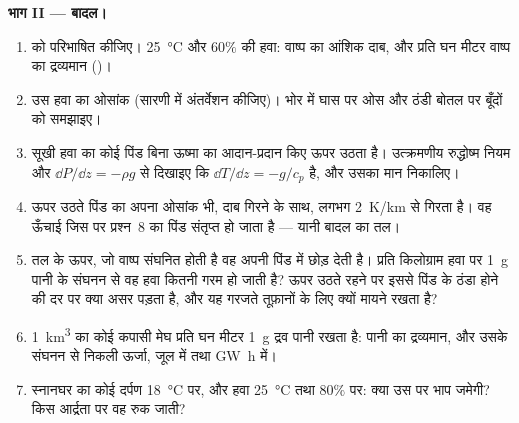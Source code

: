 \begin{problem}
\medskip
\noindent\textbf{भाग II --- बादल।}
\begin{enumerate}[resume]
  \item {} को परिभाषित कीजिए। \qty{25}{\degreeCelsius} और $60\%$
        की हवा: वाष्प का आंशिक दाब, और प्रति घन मीटर वाष्प का द्रव्यमान
        ()।
  \item उस हवा का ओसांक (सारणी में अंतर्वेशन कीजिए)। भोर में घास पर ओस और
        ठंडी बोतल पर बूँदों को समझाइए।
  \item सूखी हवा का कोई पिंड बिना ऊष्मा का आदान-प्रदान किए ऊपर उठता है।
        उत्क्रमणीय रुद्धोष्म नियम और 
        $\dd P/\dd z = -\rho g$ से दिखाइए कि $\dd T/\dd z = -g/c_p$ है, और
        उसका मान निकालिए।
  \item ऊपर उठते पिंड का अपना ओसांक भी, दाब गिरने के साथ, लगभग
        \qty{2}{K/km} से गिरता है। वह ऊँचाई जिस पर प्रश्न~8 का पिंड
        संतृप्त हो जाता है --- यानी बादल का तल।
  \item तल के ऊपर, जो वाष्प संघनित होती है वह अपनी  पिंड में
        छोड़ देती है। प्रति किलोग्राम हवा पर \qty{1}{g} पानी के संघनन से वह
        हवा कितनी गरम हो जाती है? ऊपर उठते रहने पर इससे पिंड के ठंडा होने
        की दर पर क्या असर पड़ता है, और यह गरजते तूफ़ानों के लिए क्यों
        मायने रखता है?
  \item \qty{1}{km^3} का कोई कपासी मेघ प्रति घन मीटर \qty{1}{g} द्रव पानी
        रखता है: पानी का द्रव्यमान, और उसके संघनन से निकली ऊर्जा, जूल में
        तथा \unit{GW h} में।
  \item स्नानघर का कोई दर्पण \qty{18}{\degreeCelsius} पर, और हवा
        \qty{25}{\degreeCelsius} तथा $80\%$ पर: क्या उस पर भाप जमेगी? किस
        आर्द्रता पर वह रुक जाती?
\end{enumerate}


\end{problem}
